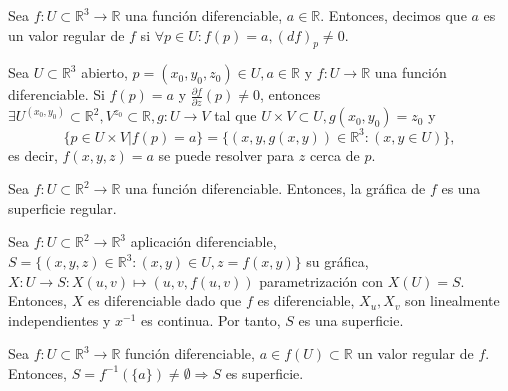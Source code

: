 \begin{defn}
  Sea $ f: U \subset \mathbb{R}^{3} \to \mathbb{R}$ una función diferenciable, $a \in \mathbb{R}$. Entonces, decimos que $a$ es un valor regular de $f$ si $\forall p \in U : f(p) = a, (df)_{p} \neq 0$.
\end{defn}

\begin{theo}
  Sea $U \subset \mathbb{R}^{3}$ abierto, $p = (x_{0}, y_{0}, z_{0}) \in U, a \in \mathbb{R}$ y $f: U \to \mathbb{R}$ una función diferenciable. Si $f(p) = a$ y $\frac{\partial{f}}{\partial{z}}(p) \neq 0$, entonces $\exists U^{(x_{0},y_{0})} \subset \mathbb{R}^{2}, V^{z_{0}} \subset \mathbb{R}, g: U \to V$ tal que $U \times V \subset U, g(x_{0}, y_{0}) = z_{0}$ y
  \[ 
    \{ p \in U \times V | f(p) = a \} = \big\{ (x,y,g(x,y)) \in \mathbb{R}^{3} : (x,y \in U) \big\} ,
  \] 
  es decir, $f(x,y,z) = a$ se puede resolver para $z$ cerca de $p$.
\end{theo}

\begin{prop}
  Sea $f : U \subset \mathbb{R}^{2} \to \mathbb{R}$ una función diferenciable. Entonces, la gráfica de $f$ es una superficie regular.
\end{prop}

\begin{dem}
  Sea $f : U \subset \mathbb{R}^{2} \to \mathbb{R}^{3}$ aplicación diferenciable, $S = \{ (x, y, z)\in \mathbb{R}^{3} : (x, y) \in U, z = f(x, y) \}$ su gráfica, $X : U \to S : X(u, v) \mapsto (u, v, f(u, v))$ parametrización con $X(U) = S$. Entonces, $X$ es diferenciable dado que $f$ es diferenciable, $X_{u}, X_{v}$ son linealmente independientes y $x^{-1}$ es continua. Por tanto, $S$ es una superficie.
\end{dem}

\begin{prop}
  Sea $f: U \subset \mathbb{R}^{3} \to \mathbb{R}$ función diferenciable, $a \in f(U) \subset \mathbb{R}$ un valor regular de $f$. Entonces, $S = f^{-1}(\{ a \}) \neq \emptyset \Rightarrow S$ es superficie.
\end{prop}

